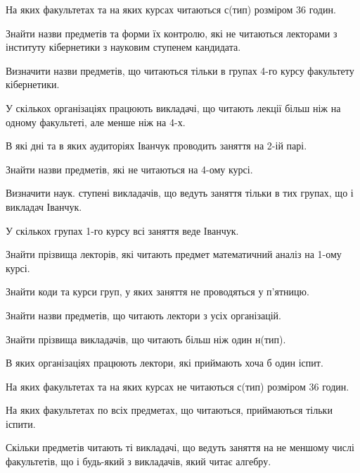 \begin{card}
    \item На яких факультетах  та на яких курсах читаються с (тип) розміром 36 годин.
    \item Знайти назви предметів та форми їх контролю, які не читаються лекторами з інституту кібернетики з науковим ступенем кандидата.
    \item Визначити назви предметів, що читаються тільки в групах 4-го курсу факультету кібернетики.
    \item У скількох організаціях працюють викладачі, що читають лекції більш ніж на одному факультеті, але менше ніж на 4-х.
\end{card}

\begin{card}
    \item В які дні та в яких аудиторіях Іванчук проводить заняття на 2-ій парі.
    \item Знайти назви предметів, які не читаються на 4-ому курсі.
    \item Визначити наук. ступені викладачів, що ведуть заняття тільки в тих групах, що і викладач Іванчук.
    \item У скількох групах 1-го курсу всі заняття веде Іванчук.
\end{card}

\begin{card}
    \item Знайти прізвища лекторів, які читають предмет математичний аналіз на 1-ому курсі.
    \item Знайти коди та курси груп, у яких заняття не проводяться у п'ятницю.
    \item Знайти назви предметів, що читають лектори з усіх організацій.
    \item Знайти прізвища викладачів, що читають більш ніж один н (тип).
\end{card}

\begin{card}
    \item В яких організаціях працюють лектори, які приймають хоча б один іспит.
    \item На яких факультетах  та на яких курсах не читаються с (тип) розміром 36 годин.
    \item На яких факультетах по всіх предметах, що читаються, приймаються тільки іспити.  
    \item Скільки предметів читають ті викладачі, що ведуть заняття на не меншому числі факультетів, що і будь-який з викладачів, який читає алгебру.
\end{card}

